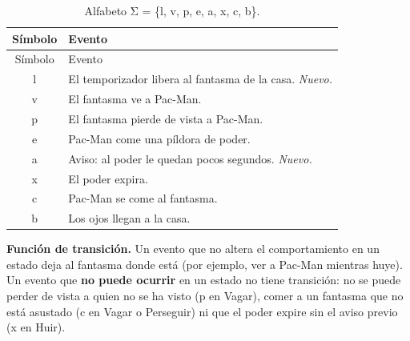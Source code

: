\begin{longtable}[]{@{}cl@{}}
\caption{Alfabeto Σ = \{l, v, p, e, a, x, c, b\}.}\tabularnewline
\toprule\noalign{}
Símbolo & Evento \\
\midrule\noalign{}
\endfirsthead
\toprule\noalign{}
Símbolo & Evento \\
\midrule\noalign{}
\endhead
\bottomrule\noalign{}
\endlastfoot
l & El temporizador libera al fantasma de la casa. \emph{Nuevo.} \\
v & El fantasma ve a Pac-Man. \\
p & El fantasma pierde de vista a Pac-Man. \\
e & Pac-Man come una píldora de poder. \\
a & Aviso: al poder le quedan pocos segundos. \emph{Nuevo.} \\
x & El poder expira. \\
c & Pac-Man se come al fantasma. \\
b & Los ojos llegan a la casa. \\
\end{longtable}

\textbf{Función de transición.} Un evento que no altera el comportamiento en un estado deja al fantasma donde está (por ejemplo, ver a Pac-Man mientras huye). Un evento que \textbf{no puede ocurrir} en un estado no tiene transición: no se puede perder de vista a quien no se ha visto (p en Vagar), comer a un fantasma que no está asustado (c en Vagar o Perseguir) ni que el poder expire sin el aviso previo (x en Huir).

